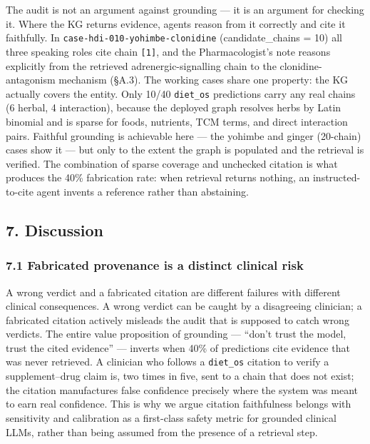\documentclass[
]{article}
\begin{document}
The audit is not an argument against grounding --- it is an argument for
checking it. Where the KG returns evidence, agents reason from it
correctly and cite it faithfully. In
\texttt{case-hdi-010-yohimbe-clonidine} (candidate\_chains = 10) all
three speaking roles cite chain \texttt{{[}1{]}}, and the
Pharmacologist's note reasons explicitly from the retrieved
adrenergic-signalling chain to the clonidine-antagonism mechanism
(§A.3). The working cases share one property: the KG actually covers the
entity. Only 10/40 \texttt{diet\_os} predictions carry any real chains
(6 herbal, 4 interaction), because the deployed graph resolves herbs by
Latin binomial and is sparse for foods, nutrients, TCM terms, and direct
interaction pairs. Faithful grounding is achievable here --- the yohimbe
and ginger (20-chain) cases show it --- but only to the extent the graph
is populated and the retrieval is verified. The combination of sparse
coverage and unchecked citation is what produces the 40\% fabrication
rate: when retrieval returns nothing, an instructed-to-cite agent
invents a reference rather than abstaining.

\hypertarget{discussion}{%
\subsection{7. Discussion}\label{discussion}}

\hypertarget{fabricated-provenance-is-a-distinct-clinical-risk}{%
\subsubsection{7.1 Fabricated provenance is a distinct clinical
risk}\label{fabricated-provenance-is-a-distinct-clinical-risk}}

A wrong verdict and a fabricated citation are different failures with
different clinical consequences. A wrong verdict can be caught by a
disagreeing clinician; a fabricated citation actively misleads the audit
that is supposed to catch wrong verdicts. The entire value proposition
of grounding --- ``don't trust the model, trust the cited evidence'' ---
inverts when 40\% of predictions cite evidence that was never retrieved.
A clinician who follows a \texttt{diet\_os} citation to verify a
supplement--drug claim is, two times in five, sent to a chain that does
not exist; the citation manufactures false confidence precisely where
the system was meant to earn real confidence. This is why we argue
citation faithfulness belongs with sensitivity and calibration as a
first-class safety metric for grounded clinical LLMs, rather than being
assumed from the presence of a retrieval step.
\end{document}
